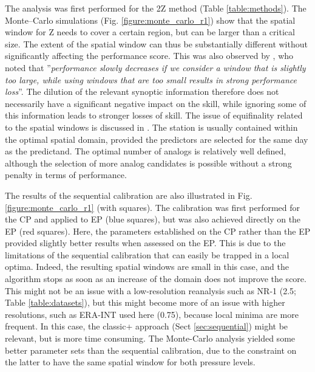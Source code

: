 \documentclass[gmdd]{copernicus}
\begin{document}
The analysis was first performed for the 2Z method (Table \ref{table:methods}). The Monte--Carlo simulations (Fig. \ref{figure:monte_carlo_r1}) show that the spatial window for Z needs to cover a certain region, but can be larger than a critical size. The extent of the spatial window can thus be substantially different without significantly affecting the performance score. This was also observed by \citet{Bontron2004}, who noted that ''\textit{performance slowly decreases if we consider a window that is slightly too large, while using windows that are too small results in strong performance loss}''. The dilution of the relevant synoptic information therefore does not necessarily have a significant negative impact on the skill, while ignoring some of this information leads to stronger losses of skill. The issue of equifinality related to the spatial windows is discussed in \cite{Radanovics2013}. The station is usually contained within the optimal spatial domain, provided the predictors are selected for the same day as the predictand. The optimal number of analogs is relatively well defined, although the selection of more analog candidates is possible without a strong penalty in terms of performance.

The results of the sequential calibration are also illustrated in Fig. \ref{figure:monte_carlo_r1} (with squares). The calibration was first performed for the CP and applied to EP (blue squares), but was also achieved directly on the EP (red squares). Here, the parameters established on the CP rather than the EP provided slightly better results when assessed on the EP. This is due to the limitations of the sequential calibration that can easily be trapped in a local optima. Indeed, the resulting spatial windows are small in this case, and the algorithm stops as soon as an increase of the domain does not improve the score. This might not be an issue with a low-resolution reanalysis such as NR-1 (2.5\degree; Table \ref{table:datasets}), but this might become more of an issue with higher resolutions, such as ERA-INT used here (0.75\degree), because local minima are more frequent. In this case, the classic+ approach (Sect \ref{sec:sequential}) might be relevant, but is more time consuming. The Monte-Carlo analysis yielded some better parameter sets than the sequential calibration, due to the constraint on the latter to have the same spatial window for both pressure levels. 
\end{document}
